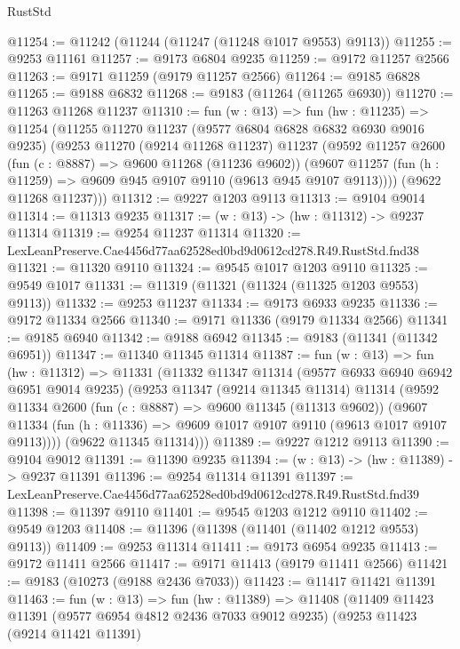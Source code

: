 \begin{lexlean}{RustStd}
\begin{coremodule}
@11254 := @11242 (@11244 (@11247 (@11248 @1017 @9553) @9113))
@11255 := @9253 @11161
@11257 := @9173 @6804 @9235
@11259 := @9172 @11257 @2566
@11263 := @9171 @11259 (@9179 @11257 @2566)
@11264 := @9185 @6828
@11265 := @9188 @6832
@11268 := @9183 (@11264 (@11265 @6930))
@11270 := @11263 @11268 @11237
@11310 := fun (w : @13) =>
  fun (hw : @11235) =>
  @11254
    (@11255
      @11270
      @11237
      (@9577 @6804 @6828 @6832 @6930 @9016 @9235)
      (@9253
        @11270
        (@9214 @11268 @11237)
        @11237
        (@9592
          @11257
          @2600
          (fun (c : @8887) => @9600 @11268 (@11236 @9602))
          (@9607 @11257 (fun (h : @11259) => @9609 @945 @9107 @9110 (@9613 @945 @9107 @9113))))
        (@9622 @11268 @11237)))
@11312 := @9227 @1203 @9113
@11313 := @9104 @9014
@11314 := @11313 @9235
@11317 := (w : @13) -> (hw : @11312) -> @9237 @11314
@11319 := @9254 @11237 @11314
@11320 := LexLeanPreserve.Cae4456d77aa62528ed0bd9d0612cd278.R49.RustStd.fnd38
@11321 := @11320 @9110
@11324 := @9545 @1017 @1203 @9110
@11325 := @9549 @1017
@11331 := @11319 (@11321 (@11324 (@11325 @1203 @9553) @9113))
@11332 := @9253 @11237
@11334 := @9173 @6933 @9235
@11336 := @9172 @11334 @2566
@11340 := @9171 @11336 (@9179 @11334 @2566)
@11341 := @9185 @6940
@11342 := @9188 @6942
@11345 := @9183 (@11341 (@11342 @6951))
@11347 := @11340 @11345 @11314
@11387 := fun (w : @13) =>
  fun (hw : @11312) =>
  @11331
    (@11332
      @11347
      @11314
      (@9577 @6933 @6940 @6942 @6951 @9014 @9235)
      (@9253
        @11347
        (@9214 @11345 @11314)
        @11314
        (@9592
          @11334
          @2600
          (fun (c : @8887) => @9600 @11345 (@11313 @9602))
          (@9607 @11334 (fun (h : @11336) => @9609 @1017 @9107 @9110 (@9613 @1017 @9107 @9113))))
        (@9622 @11345 @11314)))
@11389 := @9227 @1212 @9113
@11390 := @9104 @9012
@11391 := @11390 @9235
@11394 := (w : @13) -> (hw : @11389) -> @9237 @11391
@11396 := @9254 @11314 @11391
@11397 := LexLeanPreserve.Cae4456d77aa62528ed0bd9d0612cd278.R49.RustStd.fnd39
@11398 := @11397 @9110
@11401 := @9545 @1203 @1212 @9110
@11402 := @9549 @1203
@11408 := @11396 (@11398 (@11401 (@11402 @1212 @9553) @9113))
@11409 := @9253 @11314
@11411 := @9173 @6954 @9235
@11413 := @9172 @11411 @2566
@11417 := @9171 @11413 (@9179 @11411 @2566)
@11421 := @9183 (@10273 (@9188 @2436 @7033))
@11423 := @11417 @11421 @11391
@11463 := fun (w : @13) =>
  fun (hw : @11389) =>
  @11408
    (@11409
      @11423
      @11391
      (@9577 @6954 @4812 @2436 @7033 @9012 @9235)
      (@9253
        @11423
        (@9214 @11421 @11391)

\end{coremodule}
\end{lexlean}
